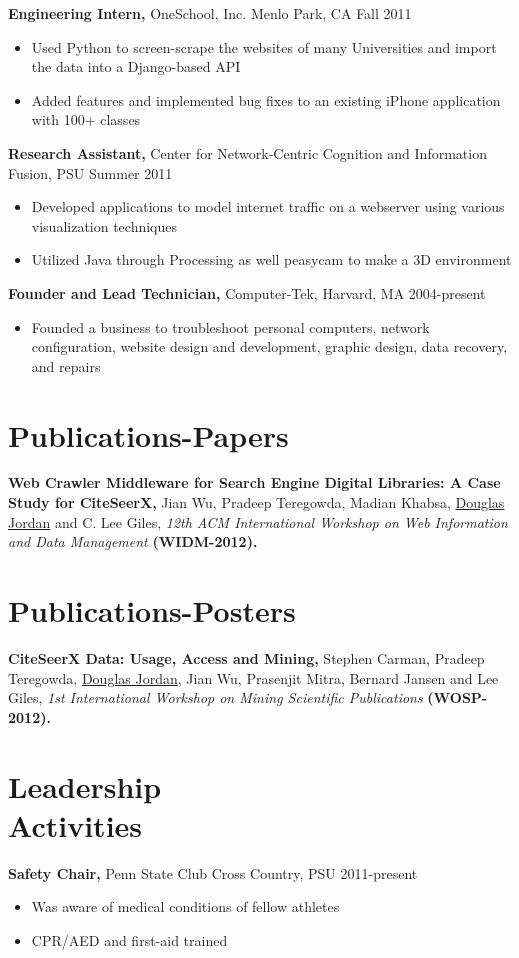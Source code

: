 \documentclass[margin]{res}
\begin{document}
\begin{resume}
{\bf Engineering Intern,} OneSchool, Inc. Menlo Park, CA \hfill Fall 2011
\begin{itemize} \itemsep -2pt %
\item Used Python to screen-scrape the websites of many Universities and import the data into a Django-based API
\item Added features and implemented bug fixes to an existing iPhone application with 100+ classes
\end{itemize}

{\bf Research Assistant,} Center for Network-Centric Cognition and Information Fusion, PSU \hfill Summer 2011
\begin{itemize} \itemsep -2pt
\item Developed applications to model internet traffic on a webserver using various visualization techniques 
\item Utilized Java through Processing as well peasycam to make a 3D environment
\end{itemize}

{\bf Founder and Lead Technician,} Computer-Tek, Harvard, MA \hfill 2004-present
\begin{itemize} \itemsep -2pt
\item Founded a business to troubleshoot personal computers, network configuration, website design and development, graphic design, data recovery, and repairs
\end{itemize}

\section{Publications-Papers}
{\bf Web Crawler Middleware for Search Engine Digital Libraries: A Case Study for CiteSeerX,} Jian Wu, Pradeep Teregowda, Madian Khabsa, \underline{Douglas Jordan} and C. Lee Giles, \emph{12th ACM International Workshop on Web Information and Data Management} {\bf (WIDM-2012).}

\section{Publications-Posters}
{\bf CiteSeerX Data: Usage, Access and Mining,} Stephen Carman, Pradeep Teregowda, \underline{Douglas Jordan}, Jian Wu, Prasenjit Mitra, Bernard Jansen and Lee Giles, \emph{1st International Workshop on Mining Scientific Publications} {\bf (WOSP-2012).}

\section{Leadership \\ Activities}
{\bf Safety Chair,} Penn State Club Cross Country, PSU \hfill 2011-present
\begin{itemize} \itemsep -2pt
\item Was aware of medical conditions of fellow athletes
\item CPR/AED and first-aid trained
\end{itemize}


\end{resume}
\end{document}
